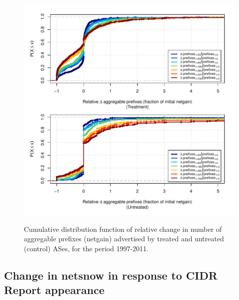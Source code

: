 \begin{figure}[H]
\begin{centering}
\begin{singlespace}
\includegraphics[width=6in]{figures/behavior-rel_netgain-1997_2011-corr.pdf}
    \vspace{-2em}\\
    \caption{Cumulative distribution function of relative change in number of
    aggregable prefixes (netgain) advertised by treated and untreated (control)
    ASes, for the period 1997-2011.}
\end{singlespace}
\end{centering}
\end{figure}

\subsection{Change in netsnow in response to CIDR Report appearance}

